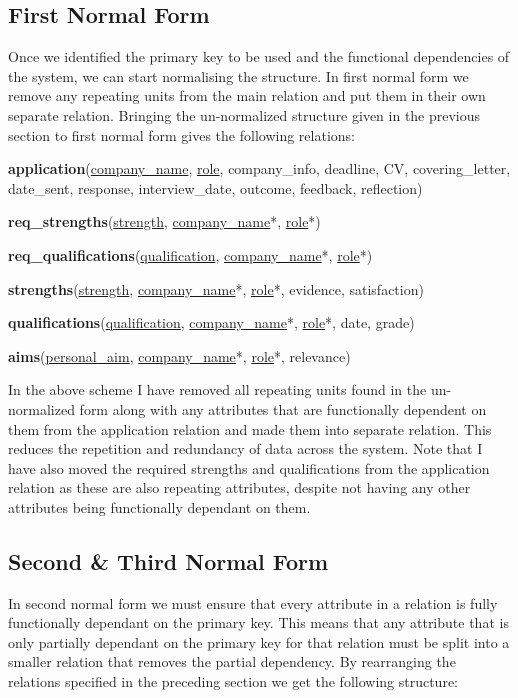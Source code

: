 \documentclass{article}
\begin{document}
\subsection{First Normal Form}

Once we identified the primary key to be used and the functional dependencies of the system, we can start normalising the structure. In first normal form we remove any repeating units from the main relation and put them in their own separate relation. Bringing the un-normalized structure given in the previous section to first normal form gives the following relations:

\textbf{application}(\underline{company\_name}, \underline{role}, company\_info, deadline, CV, covering\_letter, date\_sent, response, interview\_date, outcome, feedback, reflection)

\textbf{req\_strengths}(\underline{strength}, \underline{company\_name}*, \underline{role}*)

\textbf{req\_qualifications}(\underline{qualification}, \underline{company\_name}*, \underline{role}*)

\textbf{strengths}(\underline{strength}, \underline{company\_name}*, \underline{role}*, evidence, satisfaction)

\textbf{qualifications}(\underline{qualification}, \underline{company\_name}*, \underline{role}*, date, grade)

\textbf{aims}(\underline{personal\_aim}, \underline{company\_name}*, \underline{role}*, relevance)

In the above scheme I have removed all repeating units found in the un-normalized form along with any attributes that are functionally dependent on them from the application relation and made them into separate relation. This reduces the repetition and redundancy of data across the system. Note that I have also moved the required strengths and qualifications from the application relation as these are also repeating attributes, despite not having any other attributes being functionally dependant on them.

\subsection{Second \& Third Normal Form}

In second normal form we must ensure that every attribute in a relation is fully functionally dependant on the primary key. This means that any attribute that is only partially dependant on the primary key for that relation must be split into a smaller relation that removes the partial dependency. By rearranging the relations specified in the preceding section we get the following structure:
\end{document}
